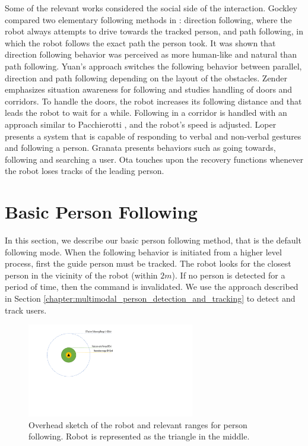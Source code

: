 Some of the relevant works considered the social side of the interaction. Gockley compared two elementary following methods in \cite{gockley2007natural}: direction following, where the robot always attempts to drive towards the tracked person, and path following, in which the robot follows the exact path the person took. It was shown that direction following behavior was perceived as more human-like and natural than path following. Yuan's approach \cite{yuan2008spatial} switches the following behavior between parallel, direction and path following depending on the layout of the obstacles. Zender \cite{zender2007human} emphasizes situation awareness for following and studies handling of doors and corridors. To handle the doors, the robot increases its following distance and that leads the robot to wait for a while. Following in a corridor is handled with an approach similar to Pacchierotti \cite{pacchierotti2005human}, and the robot's speed is adjusted. Loper \cite{loper2009mobile} presents a system that is capable of responding to verbal and non-verbal gestures and following a person. Granata \cite{granata2012framework} presents behaviors such as going towards, following and searching a user. Ota \cite{ota2013recovery} touches upon the recovery functions whenever the robot loses tracks of the leading person.

\section{Basic Person Following}
\label{sec:following_basic_person_following}

In this section, we describe our basic person following method, that is the default following mode. When the following behavior is initiated from a higher level process, first the guide person must be tracked. The robot looks for the closest person in the vicinity of the robot (within $2m$). If no person is detected for a period of time, then the command is invalidated. We use the approach described in Section \ref{chapter:multimodal_person_detection_and_tracking} to detect and track users.

\begin{figure}[ht!]
\hspace*{4cm} 
\includegraphics[width=0.65\textwidth]{pics/following_ranges_cropped}
\caption{Overhead sketch of the robot and relevant ranges for person following. Robot is represented as the triangle in the middle.}
\label{fig:following_ranges}
\end{figure}

